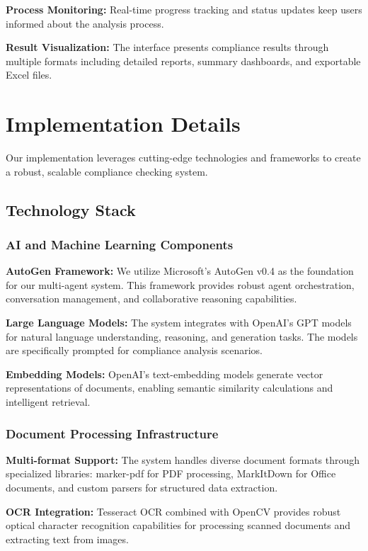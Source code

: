 \documentclass[conference]{IEEEtran}
\begin{document}
\textbf{Process Monitoring:} Real-time progress tracking and status updates keep users informed about the analysis process.

\textbf{Result Visualization:} The interface presents compliance results through multiple formats including detailed reports, summary dashboards, and exportable Excel files.

\section{Implementation Details}

Our implementation leverages cutting-edge technologies and frameworks to create a robust, scalable compliance checking system.

\subsection{Technology Stack}

\subsubsection{AI and Machine Learning Components}
\textbf{AutoGen Framework:} We utilize Microsoft's AutoGen v0.4 as the foundation for our multi-agent system. This framework provides robust agent orchestration, conversation management, and collaborative reasoning capabilities.

\textbf{Large Language Models:} The system integrates with OpenAI's GPT models for natural language understanding, reasoning, and generation tasks. The models are specifically prompted for compliance analysis scenarios.

\textbf{Embedding Models:} OpenAI's text-embedding models generate vector representations of documents, enabling semantic similarity calculations and intelligent retrieval.

\subsubsection{Document Processing Infrastructure}
\textbf{Multi-format Support:} The system handles diverse document formats through specialized libraries: marker-pdf for PDF processing, MarkItDown for Office documents, and custom parsers for structured data extraction.

\textbf{OCR Integration:} Tesseract OCR combined with OpenCV provides robust optical character recognition capabilities for processing scanned documents and extracting text from images.
\end{document}
